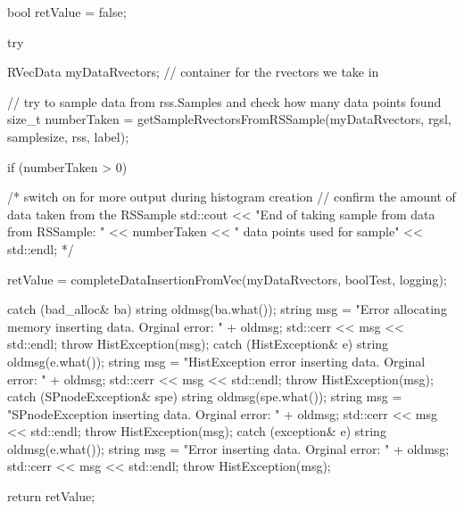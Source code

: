 \begin{DoxyCode}
{
    bool retValue = false;

    try {

        RVecData myDataRvectors; // container for the rvectors we take in

        // try to sample data from rss.Samples and check how many data points
       found
        size_t numberTaken = getSampleRvectorsFromRSSample(myDataRvectors,
                                rgsl, samplesize, rss, label);

        if (numberTaken > 0) {
            /* switch on for more output during histogram creation
            // confirm the amount of data taken from the RSSample
            std::cout << "End of taking sample from data from RSSample: "
                << numberTaken << " data points used for sample" << std::endl;
            */

            retValue = completeDataInsertionFromVec(myDataRvectors,
                                                    boolTest, logging);
        }
    }

    catch (bad_alloc& ba) {
        string oldmsg(ba.what());
        string msg = "Error allocating memory inserting data.  Orginal error: "
                                            + oldmsg;
        std::cerr << msg << std::endl;
        throw HistException(msg);
    }
    catch (HistException& e) {
        string oldmsg(e.what());
        string msg = "HistException error inserting data.  Orginal error: "
                                    + oldmsg;
        std::cerr << msg << std::endl;
        throw HistException(msg);
    }
    catch (SPnodeException& spe) {
        string oldmsg(spe.what());
        string msg = "SPnodeException inserting data.  Orginal error: " + 
      oldmsg;
        std::cerr << msg << std::endl;
        throw HistException(msg);
    }
    catch (exception& e) {
        string oldmsg(e.what());
        string msg = "Error inserting data.  Orginal error: " + oldmsg;
        std::cerr << msg << std::endl;
        throw HistException(msg);
    }

    return retValue;
}
\end{DoxyCode}
